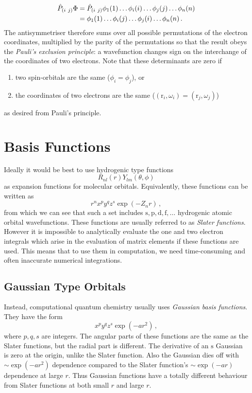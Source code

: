 \documentclass{article}
\theoremstyle{plain}\theoremheaderfont{\normalfont\itshape}\theorembodyfont{\rmfamily}\theoremseparator{.}\newtheorem*{rem}{Remark}\newtheorem*{ex}{Example}\newtheorem*{proof}{Proof}\newtheorem*{altp}{Alternative proof}
\theoremstyle{plain}\theoremheaderfont{\normalfont\bfseries}\theorembodyfont{\rmfamily}\theoremseparator{.}\newtheorem{thm}{Theorem}[section]\newtheorem{lem}[thm]{Lemma}\newtheorem{prop}[thm]{Proposition}\newtheorem*{cor}{Corollary}\newtheorem{defn}[thm]{Definition}\newtheorem{clm}[thm]{Claim}\newtheorem{clminproof}{Claim}
\theoremstyle{break}\theoremheaderfont{\normalfont\itshape}\theorembodyfont{\rmfamily}\theoremseparator{.\medskip}\newtheorem*{proofskip}{Proof}\newtheorem*{exs}{Examples}\newtheorem*{rems}{Remarks}
\theoremstyle{break}\theoremheaderfont{\normalfont\bfseries}\theorembodyfont{\rmfamily}\theoremseparator{.\medskip}\newtheorem{lemskip}[thm]{Lemma}\newtheorem{defnskip}[thm]{Definition}\newtheorem{propskip}[thm]{Proposition}\newtheorem{thmskip}[thm]{Theorem}
\numberwithin{equation}{section}
\newcommand{\vb}[1]{\bm{\mathrm{#1}}}
\begin{document}
    \begin{align}
        \hat{P}_{(i\ j)}\Phi&=\hat{P}_{(i\ j)}\phi_1(1)\dots\phi_i(i)\dots\phi_j(j)\dots\phi_n(n)\notag\\
        &=\phi_1(1)\dots\phi_i(j)\dots\phi_j(i)\dots\phi_n(n)\,.
    \end{align}
    The antisymmetriser therefore sums over all possible permutations of the electron coordinates, multiplied by the parity of the permutations so that the result obeys the \textit{Pauli's exclusion principle}: a wavefunction changes sign on the interchange of the coordinates of two electrons. Note that these determinants are zero if
    \begin{enumerate}[topsep=0pt,label=(\roman*)]
        \item two spin-orbitals are the same (\(\phi_i=\phi_j\)), or
        \item the coordinates of two electrons are the same (\((\vb{r}_i,\omega_i)=(\vb{r}_j,\omega_j)\))
    \end{enumerate}
    as desired from Pauli's principle.

    \newpage
    \section{Basis Functions}
    Ideally it would be best to use hydrogenic type functions
    \begin{equation}
        R_{nl}(r)Y_{lm}(\theta,\phi)
    \end{equation}
    as expansion functions for molecular orbitals. Equivalently, these functions can be written as
    \begin{equation}
        r^nx^py^qz^s\exp(-Z_n r)\,,
    \end{equation}
    from which we can see that such a set includes \(\mathrm{s,p,d,f,\dots}\) hydrogenic atomic orbital wavefunctions. These functions are usually referred to as \textit{Slater functions}. However it is impossible to analytically evaluate the one and two electron integrals which arise in the evaluation of matrix elements if these functions are used. This means that to use them in computation, we need time-consuming and often inaccurate numerical integrations.
    \subsection{Gaussian Type Orbitals}
    Instead, computational quantum chemistry usually uses \textit{Gaussian basis functions}. They have the form
    \begin{equation}
        x^py^qz^s\exp(-ar^2)\,,
    \end{equation}
    where \(p,q,s\) are integers. The angular parts of these functions are the same as the Slater functions, but the radial part is different. The derivative of an \(\mathrm{s}\) Gaussian is zero at the origin, unlike the Slater function. Also the Gaussian dies off with \(\sim\exp(-a r^2)\) dependence compared to the Slater function's \(\sim\exp(-ar)\) dependence at large \(r\). Thus Gaussian functions have a totally different behaviour from Slater functions at both small \(r\) and large \(r\).
\end{document}
